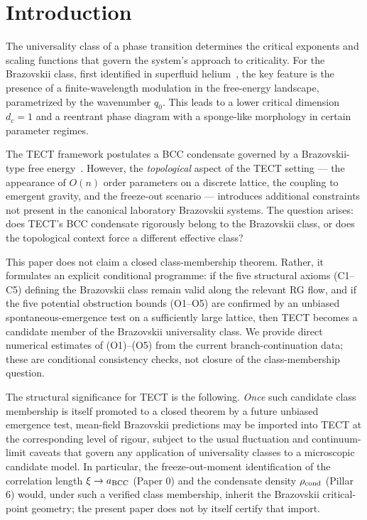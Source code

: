 \maketitle

\section{Introduction}
The universality class of a phase transition determines the critical
exponents and scaling functions that govern the system's approach to
criticality. For the Brazovskii class, first identified in
superfluid helium~\cite{Brazovskii1975}, the key feature is the
presence of a finite-wavelength modulation in the free-energy
landscape, parametrized by the wavenumber $q_0$. This leads to
a lower critical dimension $d_c = 1$ and a reentrant phase diagram
with a sponge-like morphology in certain parameter regimes.

The TECT framework postulates a BCC condensate governed by a
Brazovskii-type free energy~\cite{TECTRepo}. However, the
\emph{topological} aspect of the TECT setting — the appearance of
$O(n)$ order parameters on a discrete lattice, the coupling to emergent
gravity, and the freeze-out scenario — introduces additional
constraints not present in the canonical laboratory Brazovskii
systems. The question arises: does TECT's BCC condensate rigorously
belong to the Brazovskii class, or does the topological context force
a different effective class?

This paper does not claim a closed class-membership theorem.
Rather, it formulates an explicit conditional programme: if the
five structural axioms (C1--C5) defining the Brazovskii class
remain valid along the relevant RG flow, and if the five potential
obstruction bounds (O1--O5) are confirmed by an unbiased
spontaneous-emergence test on a sufficiently large lattice, then
TECT becomes a candidate member of the Brazovskii universality
class. We provide direct numerical estimates of (O1)--(O5) from
the current branch-continuation data; these are conditional
consistency checks, not closure of the class-membership question.

The structural significance for TECT is the following. \emph{Once}
such candidate class membership is itself promoted to a closed
theorem by a future unbiased emergence test, mean-field Brazovskii
predictions may be imported into TECT at the corresponding level of
rigour, subject to the usual fluctuation and continuum-limit caveats
that govern any application of universality classes to a microscopic
candidate model. In particular, the freeze-out-moment identification
of the correlation length $\xi \to a_{\rm BCC}$ (Paper 0) and the
condensate density $\rho_{\rm cond}$ (Pillar 6) would, under such a
verified class membership, inherit the Brazovskii critical-point
geometry; the present paper does not by itself certify that import.


